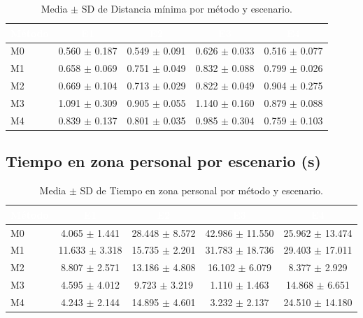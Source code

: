 \documentclass[12pt,a4paper,oneside]{book}
\begin{document}
\begin{table}[H]
\centering
\small
\caption{Media $\pm$ SD de Distancia mínima por método y escenario.}
\begin{tabular}{lcccc}
\toprule
\rowcolor{primary}
\textcolor{white}{\textbf{Método}} & \textcolor{white}{\textbf{E1}} & \textcolor{white}{\textbf{E2}} & \textcolor{white}{\textbf{E3}} & \textcolor{white}{\textbf{E4}} \\
\midrule
M0 & 0.560 $\pm$ 0.187 & 0.549 $\pm$ 0.091 & 0.626 $\pm$ 0.033 & 0.516 $\pm$ 0.077 \\
M1 & 0.658 $\pm$ 0.069 & 0.751 $\pm$ 0.049 & 0.832 $\pm$ 0.088 & 0.799 $\pm$ 0.026 \\
M2 & 0.669 $\pm$ 0.104 & 0.713 $\pm$ 0.029 & 0.822 $\pm$ 0.049 & 0.904 $\pm$ 0.275 \\
M3 & 1.091 $\pm$ 0.309 & 0.905 $\pm$ 0.055 & 1.140 $\pm$ 0.160 & 0.879 $\pm$ 0.088 \\
M4 & 0.839 $\pm$ 0.137 & 0.801 $\pm$ 0.035 & 0.985 $\pm$ 0.304 & 0.759 $\pm$ 0.103 \\
\bottomrule
\end{tabular}
\end{table}

\subsection{Tiempo en zona personal por escenario (s)}

\begin{table}[H]
\centering
\small
\caption{Media $\pm$ SD de Tiempo en zona personal por método y escenario.}
\begin{tabular}{lcccc}
\toprule
\rowcolor{primary}
\textcolor{white}{\textbf{Método}} & \textcolor{white}{\textbf{E1}} & \textcolor{white}{\textbf{E2}} & \textcolor{white}{\textbf{E3}} & \textcolor{white}{\textbf{E4}} \\
\midrule
M0 & 4.065 $\pm$ 1.441 & 28.448 $\pm$ 8.572 & 42.986 $\pm$ 11.550 & 25.962 $\pm$ 13.474 \\
M1 & 11.633 $\pm$ 3.318 & 15.735 $\pm$ 2.201 & 31.783 $\pm$ 18.736 & 29.403 $\pm$ 17.011 \\
M2 & 8.807 $\pm$ 2.571 & 13.186 $\pm$ 4.808 & 16.102 $\pm$ 6.079 & 8.377 $\pm$ 2.929 \\
M3 & 4.595 $\pm$ 4.012 & 9.723 $\pm$ 3.219 & 1.110 $\pm$ 1.463 & 14.868 $\pm$ 6.651 \\
M4 & 4.243 $\pm$ 2.144 & 14.895 $\pm$ 4.601 & 3.232 $\pm$ 2.137 & 24.510 $\pm$ 14.180 \\
\bottomrule
\end{tabular}
\end{table}
\end{document}
